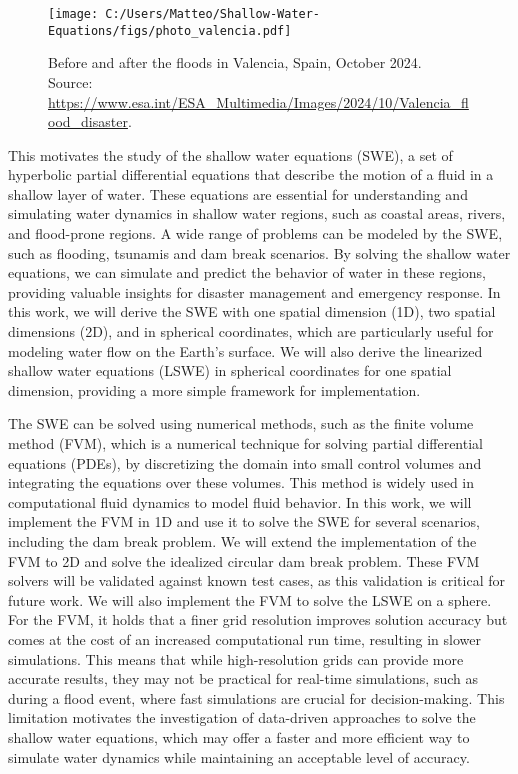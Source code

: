 \begin{figure}
    \centering
    \texttt{[image: C:/Users/Matteo/Shallow-Water-Equations/figs/photo\_valencia.pdf]}
    \caption{Before and after the floods in Valencia, Spain, October 2024.\\
            Source: \url{https://www.esa.int/ESA_Multimedia/Images/2024/10/Valencia_flood_disaster}.}\label{fig:valencia_flood}
\end{figure}
This motivates the study of the shallow water equations (SWE), a set of hyperbolic partial differential equations that describe the motion of a fluid in a shallow layer of water.
These equations are essential for understanding and simulating water dynamics in shallow water regions, such as coastal areas, rivers, and flood-prone regions.
A wide range of problems can be modeled by the SWE, such as flooding, tsunamis and dam break scenarios.
By solving the shallow water equations, we can simulate and predict the behavior of water in these regions, providing valuable insights for disaster management and emergency response.
In this work, we will derive the SWE with one spatial dimension (1D), two spatial dimensions (2D), and in spherical coordinates, which are particularly useful for modeling water flow on the Earth's surface.
We will also derive the linearized shallow water equations (LSWE) in spherical coordinates for one spatial dimension, providing a more simple framework for implementation.

The SWE can be solved using numerical methods, such as the finite volume method (FVM), which is a numerical technique for solving partial differential equations (PDEs), by discretizing the domain into small control volumes and integrating the equations over these volumes.
This method is widely used in computational fluid dynamics to model fluid behavior.
In this work, we will implement the FVM in 1D and use it to solve the SWE for several scenarios, including the dam break problem.
We will extend the implementation of the FVM to 2D and solve the idealized circular dam break problem.
These FVM solvers will be validated against known test cases, as this validation is critical for future work.
We will also implement the FVM to solve the LSWE on a sphere.
For the FVM, it holds that a finer grid resolution improves solution accuracy but comes at the cost of an increased computational run time, resulting in slower simulations.
This means that while high-resolution grids can provide more accurate results, they may not be practical for real-time simulations, such as during a flood event, where fast simulations are crucial for decision-making.
This limitation motivates the investigation of data-driven approaches to solve the shallow water equations, which may offer a faster and more efficient way to simulate water dynamics while maintaining an acceptable level of accuracy.


